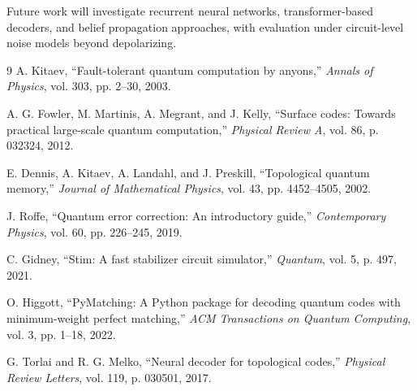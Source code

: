 \documentclass[12pt,a4paper]{article}
\begin{document}
Future work will investigate recurrent neural networks, transformer-based
decoders, and belief propagation approaches, with evaluation under
circuit-level noise models beyond depolarizing.

\begin{thebibliography}{9}
A. Kitaev, ``Fault-tolerant quantum computation by anyons,''
\textit{Annals of Physics}, vol. 303, pp. 2--30, 2003.

A. G. Fowler, M. Martinis, A. Megrant, and J. Kelly,
``Surface codes: Towards practical large-scale quantum computation,''
\textit{Physical Review A}, vol. 86, p. 032324, 2012.

E. Dennis, A. Kitaev, A. Landahl, and J. Preskill,
``Topological quantum memory,''
\textit{Journal of Mathematical Physics}, vol. 43, pp. 4452--4505, 2002.

J. Roffe, ``Quantum error correction: An introductory guide,''
\textit{Contemporary Physics}, vol. 60, pp. 226--245, 2019.

C. Gidney, ``Stim: A fast stabilizer circuit simulator,''
\textit{Quantum}, vol. 5, p. 497, 2021.

O. Higgott, ``PyMatching: A Python package for decoding quantum codes
with minimum-weight perfect matching,''
\textit{ACM Transactions on Quantum Computing}, vol. 3, pp. 1--18, 2022.

G. Torlai and R. G. Melko,
``Neural decoder for topological codes,''
\textit{Physical Review Letters}, vol. 119, p. 030501, 2017.
\end{thebibliography}
\end{document}
